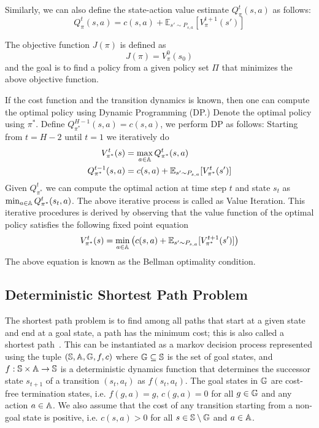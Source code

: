 Similarly, we can also define the state-action value estimate
$Q_\pi^t(s, a)$ as follows:
\begin{equation}
  \label{eq:4}
  Q_\pi^t(s, a) = c(s, a) + \mathbb{E}_{s' \sim P_{s,a}}[V_\pi^{t+1}(s')]
\end{equation}

The objective function $J(\pi)$ is defined as
\begin{equation}
  \label{eq:6}
  J(\pi) = V_\pi^0(s_0)
\end{equation}
and the goal is to find a policy from a given policy set $\Pi$ that
minimizes the above objective function.

If the cost function and the transition dynamics is known, then one
can compute the optimal policy using Dynamic Programming (DP.) Denote
the optimal policy using $\pi^*$. Define $Q_{\pi^*}^{H-1}(s, a) = c(s,
a)$, we perform DP as follows: Starting from $t = H-2$ until $t = 1$
we iteratively do
\begin{align}
  V_{\pi^*}^t(s) &= \max_{a \in \mathbb{A}} Q_{\pi^*}^t(s, a) \\
  Q_{\pi^*}^{t-1}(s, a) &= c(s, a) + \mathbb{E}_{s' \sim P_{s, a}}[V_{\pi^*}^t(s')]
\end{align}
Given $Q_{\pi^*}^t$ we can compute the optimal action at time step $t$
and state $s_t$ 
as $\min_{a \in \mathbb{A}} Q_{\pi^*}^t(s_t, a)$. The above
iterative process is called as Value Iteration. This iterative
procedures is derived by observing that the value function of the
optimal policy satisfies the following fixed point equation
\begin{equation}
  \label{eq:8}
  V_{\pi^*}^t(s) = \min_{a \in \mathbb{A}} \left( c(s, a) + \mathbb{E}_{s'
  \sim P_{s,a}}[V_{\pi^*}^{t+1}(s')]\right)
\end{equation}
The above equation is known as the Bellman optimality condition.

\subsection{Deterministic Shortest Path Problem}
\label{sec:determ-short-path}

The shortest path problem is to find among all paths that start at a
given state and end at a goal state, a path has the minimum cost; this
is also called a shortest path~\cite{bertsekas1995neuro}. This can be instantiated as a markov
decision process represented using the tuple $(\mathbb{S},
\mathbb{A}, \mathbb{G}, f, c)$ where $\mathbb{G} \subseteq
\mathbb{S}$ is the set of goal states, and $f:\mathbb{S} \times
\mathbb{A} \rightarrow \mathbb{S}$ is a deterministic
dynamics function that determines the successor state $s_{t+1}$ of a
transition $(s_t, a_t)$ as $f(s_t, a_t)$. The goal states in
$\mathbb{G}$ are cost-free termination states, i.e. $f(g, a) = g$, $c(g,
a) = 0$ for
all $g \in \mathbb{G}$ and any action $a \in \mathbb{A}$. We also
assume that the cost of any transition starting from a non-goal state
is positive, i.e. $c(s, a) > 0$ for all $s \in \mathbb{S} \setminus
\mathbb{G}$ and $a \in \mathbb{A}$.

